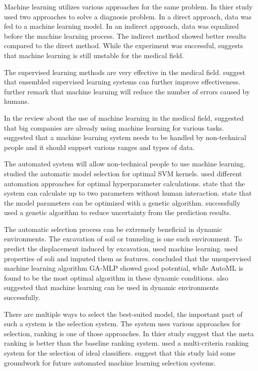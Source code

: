 Machine learning utilizes various approaches for the same problem. In thier study \cite*{ref_paper_8} used two approaches to solve a diagnosis problem. In a direct approach, data was fed to a machine learning model. In an indirect approach, data was equalized before the machine learning process. The indirect method showed better results compared to the direct method. While the experiment was successful, \citeauthor{ref_paper_8} suggests that machine learning is still unstable for the medical field.

The supervised learning methods are very effective in the medical field. \cite*{ref_paper_11} suggest that ensembled supervised learning systems can further improve effectiveness. \citeauthor{ref_paper_11} further remark that machine learning will reduce the number of errors caused by humans.

In the review about the use of machine learning in the medical field, \cite*{ref_paper_33} suggested that big companies are already using machine learning for various tasks. \citeauthor{ref_paper_33} suggested that a machine learning system needs to be handled by non-technical people and it should support various ranges and types of data.

The automated system will allow non-technical people to use machine learning. \cite*{ref_paper_3} studied the automatic model selection for optimal SVM kernels. \citeauthor{ref_paper_3} used different automation approaches for optimal hyperparameter calculations. \citeauthor{ref_paper_3} state that the system can calculate up to two parameters without human interaction. \cite*{ref_paper_39} state that the model parameters can be optimized with a genetic algorithm. \citeauthor{ref_paper_39} successfully used a genetic algorithm to reduce uncertainty from the prediction results.

The automatic selection process can be extremely beneficial in dynamic environments. The excavation of soil or tunneling is one such environment. To predict the displacement induced by excavation, \cite*{ref_paper_1} used machine learning. \citeauthor{ref_paper_1} used properties of soli and imputed them as features. \citeauthor{ref_paper_1} concluded that the unsupervised machine learning algorithm GA-MLP showed good potential, while AutoML is found to be the most optimal algorithm in these dynamic conditions. \cite*{ref_paper_13} also suggested that machine learning can be used in dynamic environments successfully.

There are multiple ways to select the best-suited model, the important part of such a system is the selection system. The system uses various approaches for selection, ranking is one of those approaches. In thier study \cite*{ref_paper_23} suggest that the meta ranking is better than the baseline ranking system. \citeauthor{ref_paper_23} used a multi-criteria ranking system for the selection of ideal classifiers. \citeauthor{ref_paper_23} suggest that this study laid some groundwork for future automated machine learning selection systems.
